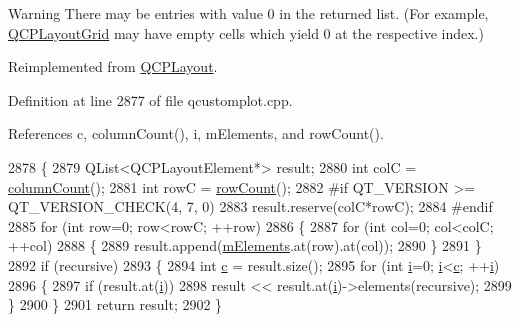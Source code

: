 \begin{DoxyWarning}{Warning}
There may be entries with value 0 in the returned list. (For example, \hyperlink{class_q_c_p_layout_grid}{Q\+C\+P\+Layout\+Grid} may have empty cells which yield 0 at the respective index.) 
\end{DoxyWarning}


Reimplemented from \hyperlink{class_q_c_p_layout_a51fe2675b53e829130b229bc1f7b0f99}{Q\+C\+P\+Layout}.



Definition at line 2877 of file qcustomplot.\+cpp.



References c, column\+Count(), i, m\+Elements, and row\+Count().


\begin{DoxyCode}
2878 \{
2879   QList<QCPLayoutElement*> result;
2880   \textcolor{keywordtype}{int} colC = \hyperlink{class_q_c_p_layout_grid_ac39074eafd148b82d0762090f258189e}{columnCount}();
2881   \textcolor{keywordtype}{int} rowC = \hyperlink{class_q_c_p_layout_grid_af8e6c7a05864ebe610c87756c7b9079c}{rowCount}();
2882 \textcolor{preprocessor}{#if QT\_VERSION >= QT\_VERSION\_CHECK(4, 7, 0)}
2883   result.reserve(colC*rowC);
2884 \textcolor{preprocessor}{#endif}
2885   \textcolor{keywordflow}{for} (\textcolor{keywordtype}{int} row=0; row<rowC; ++row)
2886   \{
2887     \textcolor{keywordflow}{for} (\textcolor{keywordtype}{int} col=0; col<colC; ++col)
2888     \{
2889       result.append(\hyperlink{class_q_c_p_layout_grid_a3577d3855bf8ad20ef9079291a49f397}{mElements}.at(row).at(col));
2890     \}
2891   \}
2892   \textcolor{keywordflow}{if} (recursive)
2893   \{
2894     \textcolor{keywordtype}{int} \hyperlink{_comparision_pictures_2_createtest_image_8m_ae0323a9039add2978bf5b49550572c7c}{c} = result.size();
2895     \textcolor{keywordflow}{for} (\textcolor{keywordtype}{int} \hyperlink{_comparision_pictures_2_createtest_image_8m_a6f6ccfcf58b31cb6412107d9d5281426}{i}=0; \hyperlink{_comparision_pictures_2_createtest_image_8m_a6f6ccfcf58b31cb6412107d9d5281426}{i}<\hyperlink{_comparision_pictures_2_createtest_image_8m_ae0323a9039add2978bf5b49550572c7c}{c}; ++\hyperlink{_comparision_pictures_2_createtest_image_8m_a6f6ccfcf58b31cb6412107d9d5281426}{i})
2896     \{
2897       \textcolor{keywordflow}{if} (result.at(\hyperlink{_comparision_pictures_2_createtest_image_8m_a6f6ccfcf58b31cb6412107d9d5281426}{i}))
2898         result << result.at(\hyperlink{_comparision_pictures_2_createtest_image_8m_a6f6ccfcf58b31cb6412107d9d5281426}{i})->elements(recursive);
2899     \}
2900   \}
2901   \textcolor{keywordflow}{return} result;
2902 \}
\end{DoxyCode}


